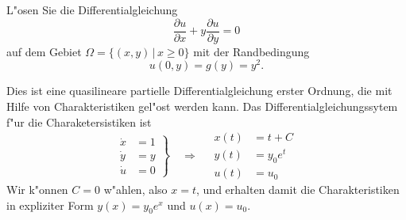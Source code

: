 L"osen Sie die Differentialgleichung
\[
\frac{\partial u}{\partial x}+y\frac{\partial u}{\partial y}=0
\]
auf dem Gebiet $\Omega=\{(x,y)\,|\, x\ge 0\}$ mit der Randbedingung
\[
u(0,y)=g(y)=y^2.
\]

\begin{loesung}
Dies ist eine quasilineare partielle Differentialgleichung
erster Ordnung, die mit Hilfe von Charakteristiken gel"ost werden
kann. Das Differentialgleichungssytem f"ur die  Charaketersistiken ist
\[
\left.
\begin{aligned}
\dot x&=1\\
\dot y&=y\\
\dot u&=0
\end{aligned}
\right\}\quad\Rightarrow\quad
\begin{aligned}
x(t)&=t+C\\
y(t)&=y_0e^t\\
u(t)&=u_0
\end{aligned}
\]
Wir k"onnen $C=0$ w"ahlen, also $x=t$, und erhalten damit die
Charakteristiken in expliziter Form $y(x)=y_0e^x$ und $u(x)=u_0$.


\end{loesung}
